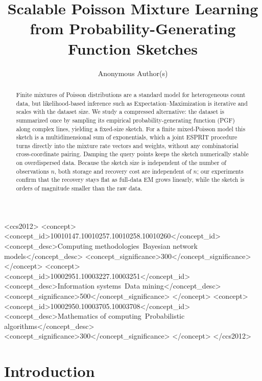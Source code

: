 \documentclass[sigconf,natbib=true,anonymous=true,review=true]{acmart}
\title{Scalable Poisson Mixture Learning from Probability-Generating Function Sketches}
\author{Anonymous Author(s)}
\affiliation{%
  \institution{Anonymous Institution}
  \city{Anonymous City}
  \country{Anonymous Country}}
\begin{document}
\begin{abstract}
Finite mixtures of Poisson distributions are a standard model for heterogeneous count data, but likelihood-based inference such as Expectation--Maximization is iterative and scales with the dataset size. We study a compressed alternative: the dataset is summarized once by sampling its empirical probability-generating function (PGF) along complex lines, yielding a fixed-size sketch. For a finite mixed-Poisson model this sketch is a multidimensional sum of exponentials, which a joint ESPRIT procedure turns directly into the mixture rate vectors and weights, without any combinatorial cross-coordinate pairing. Damping the query points keeps the sketch numerically stable on overdispersed data. Because the sketch size is independent of the number of observations $n$, both storage and recovery cost are independent of $n$; our experiments confirm that the recovery stays flat as full-data EM grows linearly, while the sketch is orders of magnitude smaller than the raw data.
\end{abstract}

\begin{CCSXML}
<ccs2012>
<concept>
<concept_id>10010147.10010257.10010258.10010260</concept_id>
<concept_desc>Computing methodologies~Bayesian network models</concept_desc>
<concept_significance>300</concept_significance>
</concept>
<concept>
<concept_id>10002951.10003227.10003251</concept_id>
<concept_desc>Information systems~Data mining</concept_desc>
<concept_significance>500</concept_significance>
</concept>
<concept>
<concept_id>10002950.10003705.10003708</concept_id>
<concept_desc>Mathematics of computing~Probabilistic algorithms</concept_desc>
<concept_significance>300</concept_significance>
</concept>
</ccs2012>
\end{CCSXML}



\maketitle

\section{Introduction}
\end{document}
